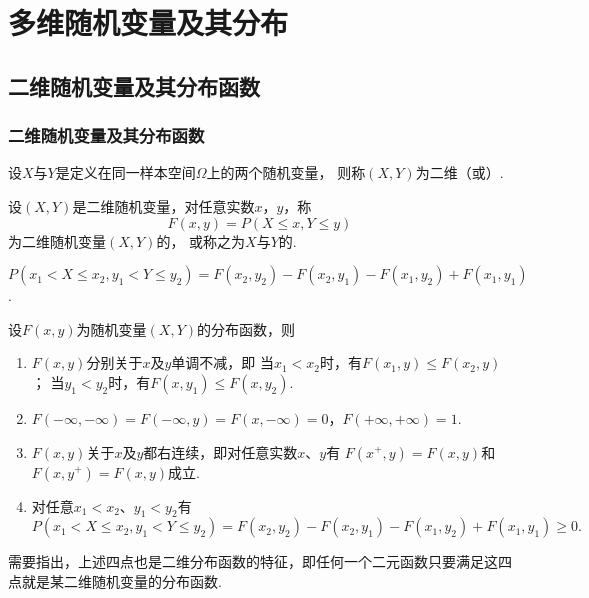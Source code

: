 \chapter{多维随机变量及其分布}
\section{二维随机变量及其分布函数}
\subsection{二维随机变量及其分布函数}
\begin{definition}
设\(X\)与\(Y\)是定义在同一样本空间\(\Omega\)上的两个随机变量，
则称\((X,Y)\)为二维（或）.
\end{definition}

\begin{definition}
设\((X,Y)\)是二维随机变量，对任意实数\(x\)，\(y\)，称\begin{equation}\label{equation:多维随机变量及其分布.二维分布函数的定义式}
F(x,y) = P(X \leq x, Y \leq y)
\end{equation}为二维随机变量\((X,Y)\)的，
或称之为\(X\)与\(Y\)的.
\end{definition}

\begin{property}
\(P(x_1 < X \leq x_2, y_1 < Y \leq y_2)
= F(x_2,y_2) - F(x_2,y_1) - F(x_1,y_2) + F(x_1,y_1)\).
\end{property}

\begin{property}
设\(F(x,y)\)为随机变量\((X,Y)\)的分布函数，则
\begin{enumerate}
\item \(F(x,y)\)分别关于\(x\)及\(y\)单调不减，即
当\(x_1 < x_2\)时，有\(F(x_1,y) \leq F(x_2,y)\)；
当\(y_1 < y_2\)时，有\(F(x,y_1) \leq F(x,y_2)\).
\item \(F(-\infty,-\infty)=F(-\infty,y)=F(x,-\infty)=0\)，\(F(+\infty,+\infty)=1\).
\item \(F(x,y)\)关于\(x\)及\(y\)都右连续，即对任意实数\(x\)、\(y\)有
\(F(x^+,y)=F(x,y)\)和\(F(x,y^+)=F(x,y)\)成立.
\item 对任意\(x_1 < x_2\)、\(y_1 < y_2\)有\[
P(x_1 < X \leq x_2, y_1 < Y \leq y_2)
= F(x_2,y_2) - F(x_2,y_1) - F(x_1,y_2) + F(x_1,y_1)
\geq 0.
\]
\end{enumerate}
\rm
需要指出，上述四点也是二维分布函数的特征，即任何一个二元函数只要满足这四点就是某二维随机变量的分布函数.
\end{property}


